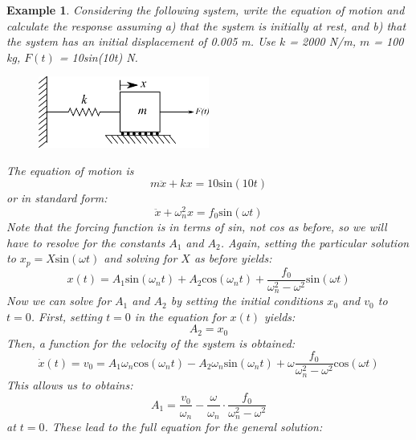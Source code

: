\documentclass[12pt,letter]{article}
\newtheorem{ex}{Example}
\numberwithin{ex}{section} %
\newenvironment{example}{\begin{mdframed}[middlelinewidth=0.5mm]\begin{ex}\normalfont}{\end{ex}\end{mdframed}}
\begin{document}
\begin{example}
			Considering the following system, write the equation of motion and calculate the response assuming a) that the system is initially at rest, and b) that the system has an initial displacement of 0.005 m. Use $k$ = 2000 N/m, $m$ = 100 kg, $F(t)$ = 10sin(10t) N.
			\begin{figure}[H]
				\centering
				\includegraphics[width=0.5\textwidth]{../Figures/forced_spring_mass_system.png}
			\end{figure}
			The equation of motion is
			\begin{equation}
				m\ddot{x}+kx=10\text{sin}(10t)
			\end{equation}
			or in standard form:
			\begin{equation}
				\ddot{x}+\omega_n^2x=f_0\text{sin}(\omega t)
			\end{equation}							
			Note that the forcing function is in terms of sin, not cos as before, so we will have to resolve for the constants $A_1$ and $A_2$. Again, setting the particular solution to $x_p=X\text{sin}(\omega t)$ and solving for $X$ as before yields:
			\begin{equation}
				x(t) = A_1\text{sin}(\omega_n t) + A_2\text{cos}(\omega_n t) + \frac{f_0}{\omega_n^2-\omega^2}\text{sin}(\omega t)
			\end{equation}	
			Now we can solve for $A_1$ and $A_2$ by setting the initial conditions $x_0$ and $v_0$ to $t=0$. First, setting $t=0$ in the equation for $x(t)$ yields:
			\begin{equation}
				A_2 = x_0
			\end{equation}	
			Then, a function for the velocity of the system is obtained: 
			\begin{equation}
				\dot{x}(t) = v_0 = A_1\omega_n\text{cos}(\omega_n t) - A_2\omega_n\text{sin}(\omega_n t) + \omega\frac{f_0}{\omega_n^2-\omega^2}\text{cos}(\omega t)
			\end{equation}				
			This allows us to obtains:
			\begin{equation}
				A_1 = \frac{v_0}{\omega_n}-\frac{\omega}{\omega_n}\cdot \frac{f_0}{\omega_n^2-\omega^2}
			\end{equation}	
			at $t=0$. These lead to the full equation for the general solution:

\end{example}
\end{document}
